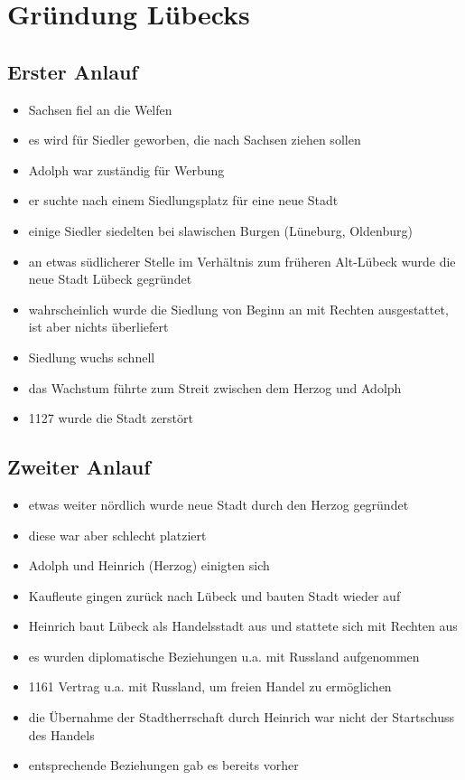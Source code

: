 \documentclass[10pt,a4paper,oneside,ngerman,numbers=noenddot]{scrartcl}
\newenvironment{myitemize}{\begin{itemize}\itemsep -2pt}{\end{itemize}} %
\begin{document}
\section*{Gründung Lübecks}

\subsection*{Erster Anlauf}
\begin{myitemize}
    \item Sachsen fiel an die Welfen
    \item es wird für Siedler geworben, die nach Sachsen ziehen sollen
    \item Adolph war zuständig für Werbung
    \item er suchte nach einem Siedlungsplatz für eine neue Stadt
    \item einige Siedler siedelten bei slawischen Burgen (Lüneburg, Oldenburg)
    \item an etwas südlicherer Stelle im Verhältnis zum früheren Alt-Lübeck wurde die neue Stadt Lübeck gegründet
    \item wahrscheinlich wurde die Siedlung von Beginn an mit Rechten ausgestattet, ist aber nichts überliefert
    \item Siedlung wuchs schnell
    \item das Wachstum führte zum Streit zwischen dem Herzog und Adolph
    \item 1127 wurde die Stadt zerstört
\end{myitemize}

\subsection*{Zweiter Anlauf}
\begin{myitemize}
    \item etwas weiter nördlich wurde neue Stadt durch den Herzog gegründet
    \item diese war aber schlecht platziert
    \item Adolph und Heinrich (Herzog) einigten sich
    \item Kaufleute gingen zurück nach Lübeck und bauten Stadt wieder auf
    \item Heinrich baut Lübeck als Handelsstadt aus und stattete sich mit Rechten aus
    \item es wurden diplomatische Beziehungen u.a. mit Russland aufgenommen
    \item 1161 Vertrag u.a. mit Russland, um freien Handel zu ermöglichen
    \item die Übernahme der Stadtherrschaft durch Heinrich war nicht der Startschuss des Handels
    \item entsprechende Beziehungen gab es bereits vorher
\end{myitemize}
\end{document}
